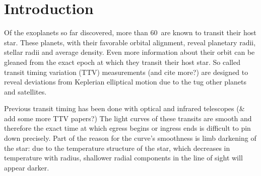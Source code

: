 \documentclass[manuscript]{aastex}
\newcommand{\numt}{60}
\begin{document}

\section{Introduction}
Of the exoplanets so far discovered, more than \numt\ are known to
transit their host star. These planets, with their favorable orbital
alignment, reveal planetary radii, stellar radii and average
density. Even more information about their orbit can be gleaned from
the exact epoch at which they transit their host star. So called
transit timing variation (TTV) measurements
\citep{2005MNRAS.359..567A} (and cite more?) are designed to reveal
deviations from Keplerian elliptical motion due to the tug other
planets and satellites.

Previous transit timing has been done with optical and infrared
telescopes \citep{2004ApJ...613L.153A,2010A&A...510A.107M} (\&
add some more TTV papers?) The light curves of these transits are smooth
and therefore the exact time at which egress begins or ingress ends is
difficult to pin down precisely. Part of the reason for the curve's
smoothness is limb darkening of the star: due to the temperature
structure of the star, which decreases in temperature with radius,
shallower radial components in the line of sight will appear
darker.

\end{document}
